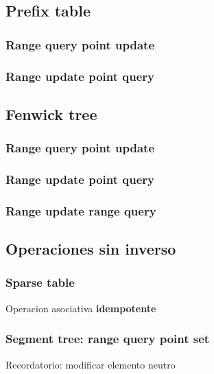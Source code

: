 \subsection{Prefix table}
    \subsubsection{Range query point update}
    \subsubsection{Range update point query}
\subsection{Fenwick tree}
    \subsubsection{Range query point update}
    \subsubsection{Range update point query}
    \subsubsection{Range update range query}
\subsection{Operaciones sin inverso}
    \subsubsection{Sparse table}
        Operacion asociativa \textbf{idempotente}
    \subsubsection{Segment tree: range query point set}
        Recordatorio: modificar elemento neutro
       
